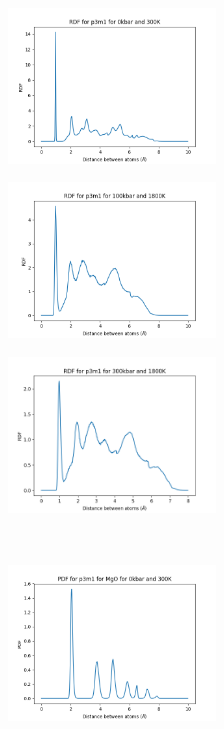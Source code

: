 \documentclass[a4paper,12pt]{article}
\begin{document}
\begin{figure}[h!!!!!!!!!!!!]
	\centering
		\begin{subfigure}{0.32\textwidth}
		\centering
		\includegraphics[width=5.5cm]{figures/p3_rdf_p0_t300.png}
		\label{Fig12a}
	\end{subfigure}%
	\begin{subfigure}{0.32\textwidth}
		\centering
		\includegraphics[width=5.5cm]{figures/p3_rdf_p100_t1800.png}
		\label{Fig12b}
	\end{subfigure}%
	\begin{subfigure}{0.32\textwidth}
	\centering
	\includegraphics[width=5.5cm]{figures/rdfp3p300t1800c100.png}
	\label{Fig12c}
\end{subfigure}%
\\
	\begin{subfigure}{0.32\textwidth}
	\centering
	\includegraphics[width=5.5cm]{figures/p3_pdf_MgO_p0_t300.png}

\end{subfigure}
\end{figure}
\end{document}
